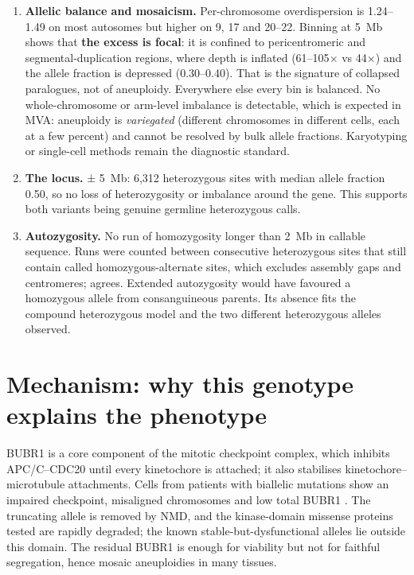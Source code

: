 \documentclass[10pt]{article}
\begin{document}
\begin{enumerate}
\item \textbf{Allelic balance and mosaicism.} Per-chromosome overdispersion is 1.24–1.49 on most autosomes but
  higher on 9, 17 and 20–22. Binning at 5~Mb shows that \textbf{the excess is focal}: it is confined to
  pericentromeric and segmental-duplication regions, where depth is inflated (61–105$\times$ vs 44$\times$) and the
  allele fraction is depressed (0.30–0.40). That is the signature of collapsed paralogues, not of aneuploidy.
  Everywhere else every bin is balanced. No whole-chromosome or arm-level imbalance is detectable, which is expected in
  MVA: aneuploidy is \textit{variegated} (different chromosomes in different cells, each at a few percent) and
  cannot be resolved by bulk allele fractions. Karyotyping or single-cell methods remain the diagnostic standard.
\item \textbf{The  locus.}  ± 5~Mb: 6,312 heterozygous sites with median allele fraction
  0.50, so no loss of heterozygosity or imbalance around the gene. This supports both variants being genuine germline
  heterozygous calls.
\item \textbf{Autozygosity.} No run of homozygosity longer than 2~Mb in callable sequence. Runs were counted between
  consecutive heterozygous sites that still contain called homozygous-alternate sites, which excludes assembly gaps
  and centromeres;  agrees. Extended autozygosity would have favoured a homozygous allele from
  consanguineous parents. Its absence fits the compound heterozygous model and the two different heterozygous
  alleles observed.
\end{enumerate}

\section{Mechanism: why this genotype explains the phenotype}
BUBR1 is a core component of the mitotic checkpoint complex, which inhibits APC/C–CDC20 until every kinetochore is
attached; it also stabilises kinetochore–microtubule attachments. Cells from patients with biallelic 
mutations show an impaired checkpoint, misaligned chromosomes and low total BUBR1 \citep{suij}. The truncating
allele is removed by NMD, and the kinase-domain missense proteins tested are rapidly degraded; the known
stable-but-dysfunctional alleles lie outside this domain. The residual BUBR1 is enough
for viability but not for faithful segregation, hence mosaic aneuploidies in many tissues.
\end{document}
